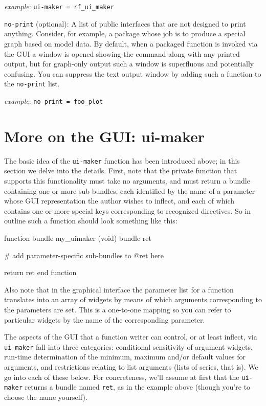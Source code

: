 \documentclass[oneside]{book}
\newcommand{\ttusage}[1]{\textit{example}: \quad \texttt{#1}}
\begin{document}
\begin{description}
  \ttusage{ui-maker = rf\_ui\_maker}

\item \texttt{no-print} (optional): A list of public interfaces that
  are not designed to print anything.  Consider, for example, a
  package whose job is to produce a special graph based on model data.
  By default, when a packaged function is invoked via the GUI a window
  is opened showing the command along with any printed output, but for
  graph-only output such a window is superfluous and potentially
  confusing. You can suppress the text output window by adding such a
  function to the \texttt{no-print} list.

  \ttusage{no-print = foo\_plot}

\end{description}

\section{More on the GUI: ui-maker}
\label{sec:ui-maker}

The basic idea of the \texttt{ui-maker} function has been introduced
above; in this section we delve into the details.  First, note that
the private function that supports this functionality must take no
arguments, and must return a bundle containing one or more
sub-bundles, each identified by the name of a parameter whose GUI
representation the author wishes to inflect, and each of which
contains one or more special keys corresponding to recognized
directives. So in outline such a function should look something like
this:
\begin{code}
function bundle my_uimaker (void)
    bundle ret

    # add parameter-specific sub-bundles to @ret here

    return ret
end function
\end{code}

Also note that in the graphical interface the parameter list for a
function translates into an array of widgets by means of which
arguments corresponding to the parameters are set. This is a
one-to-one mapping so you can refer to particular widgets by the name
of the corresponding parameter.

The aspects of the GUI that a function writer can control, or at least
inflect, via \texttt{ui-maker} fall into three categories: conditional
sensitivity of argument widgets, run-time determination of the
minimum, maximum and/or default values for arguments, and restrictions
relating to list arguments (lists of series, that is). We go into each
of these below. For concreteness, we'll assume at first that the
\texttt{ui-maker} returns a bundle named \texttt{ret}, as in the
example above (though you're to choose the name yourself).
\end{document}

